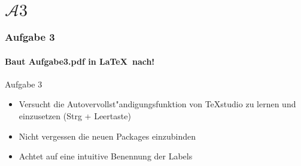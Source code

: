 \section{$\mathcal{A}3$} 
\begin{frame}
\frametitle{Aufgabe 3}
\framesubtitle{Baut Aufgabe3.pdf in \LaTeX ~nach!} 

\begin{block}{Aufgabe 3}
\begin{itemize}
\item Versucht die Autovervollst"andigungsfunktion von \TeX studio zu lernen und einzusetzen
{\footnotesize(Strg + Leertaste)}
\item Nicht vergessen die neuen Packages einzubinden 
\item Achtet auf eine intuitive Benennung der Labels
\end{itemize}
\end{block}
\end{frame}
